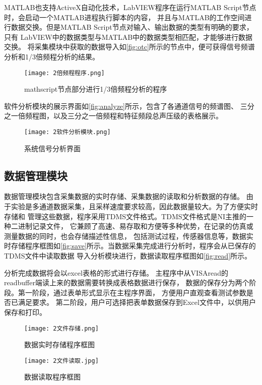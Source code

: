 MATLAB也支持ActiveX自动化技术，LabVIEW程序在运行MATLAB Script节点时，会启动一个MATLAB进程执行脚本的内容，
并且与MATLAB的工作空间进行数据交换。但是MATLAB Script节点对输入、输出数据的类型有明确的要求，只有
LabVIEW中的数据类型与MATLAB中的数据类型相匹配，才能够进行数据交换\cite{苏宝定2008基于}。
将采集模块中获取的数据导入如\autoref{fig:otc}所示的节点中，便可获得信号频谱分析和1/3倍频程分析的结果。
\begin{figure}[htbp]
    \centering
    \texttt{[image: 2倍频程程序.png]}
    \caption{\label{fig:otc}mathscript节点部分进行1/3倍频程分析的程序}
\end{figure}

软件分析模块的展示界面如\autoref{fig:analyze}所示，包含了各通道信号的频谱图、
三分之一倍频程图，以及三分之一倍频程和特征频段总声压级的表格展示。
\begin{figure}[htbp]
    \centering
    \texttt{[image: 2软件分析模块.png]}
    \caption{\label{fig:analyze}系统信号分析界面}
\end{figure}

\subsection{数据管理模块}
数据管理模块包含采集数据的实时存储、采集数据的读取和分析数据的存储。
由于实验是多通道数据采集，且采样速度要求较高，因此数据量较大。为了方便实时存储和
管理这些数据，程序采用TDMS文件格式。TDMS文件格式是NI主推的一种二进制记录文件，
它兼顾了高速、易存取和方便等多种优势，在记录的仿真或测量数据的同时，也会存储描述性信息，
包括测试过程，传感器信息等，数据实时存储程序框图如\autoref{fig:save}所示。当数据采集完成进行分析时，程序会从已保存的TDMS文件中读取数据
导入分析模块进行，数据读取程序框图如\autoref{fig:read}所示。

分析完成数据将会以excel表格的形式进行存储。
主程序中从VISAread的readbuffer端读上来的数据需要转换成表格数据进行保存，
数据的保存分为两个阶段。第一阶段，通过表单形式显示在主程序界面，
方便用户直观查看测试参数是否已满足要求。
第二阶段，用户可选择把表单数据保存到Excel文件中，以供用户保存和打印。
\begin{figure}[htbp]
    \centering
    \texttt{[image: 2文件存储.png]}
    \caption{\label{fig:save}数据实时存储程序框图}
\end{figure}
\begin{figure}[htbp]
    \centering
    \texttt{[image: 2文件读取.jpg]}
    \caption{\label{fig:read}数据读取程序框图}
\end{figure}
